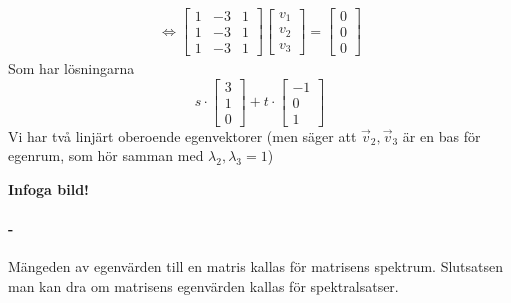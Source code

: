 \begin{Ex}
\begin{gather*}
		\Leftrightarrow
		\begin{bmatrix}
			1 & -3 & 1\\
			1 & -3 & 1\\
			1 & -3 & 1
		\end{bmatrix}
		\begin{bmatrix} v_1\\v_2\\v_3 \end{bmatrix}
		= \begin{bmatrix} 0\\0\\0 \end{bmatrix}
	\end{gather*}
	Som har lösningarna
	\[
	s \cdot \begin{bmatrix} 3\\1\\0 \end{bmatrix} + t \cdot \begin{bmatrix} -1\\0\\1 \end{bmatrix}
	\]
	Vi har två linjärt oberoende egenvektorer (men säger att $\vec{v}_2, \vec{v}_3$ är en bas för egenrum, som hör samman med $\lambda_2 ,\lambda_3 = 1$)\\
	\begin{center}
		\textbf{Infoga bild!}
	\end{center}
\end{Ex}
\paragraph{-} %
\label{par:_}
Mängeden av egenvärden till en matris kallas för matrisens spektrum. Slutsatsen man kan dra om matrisens egenvärden kallas för spektralsatser.

